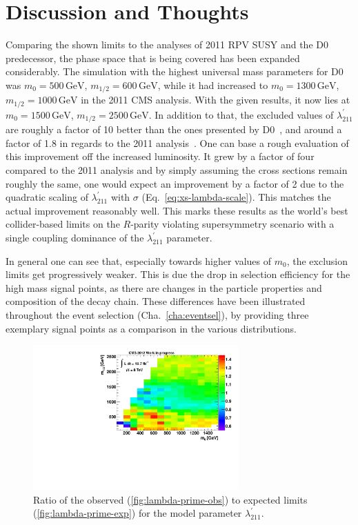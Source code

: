 \section{Discussion and Thoughts}
\label{sec:discussion}

Comparing the shown limits to the analyses of 2011 RPV SUSY and the D0 predecessor, the phase space that is being covered has been expanded considerably. The simulation with the highest universal mass parameters for D0 was $m_0 = 500\,\text{GeV}$, $m_{1/2} = 600\,\text{GeV}$, while it had increased to $m_0 = 1300\,\text{GeV}$, $m_{1/2} = 1000\,\text{GeV}$ in the 2011 CMS analysis. With the given results, it now lies at $m_0 = 1500\,\text{GeV}$, $m_{1/2} = 2500\,\text{GeV}$. In addition to that, the excluded values of $\lambda^{\prime}_{211}$ are roughly a factor of 10 better than the ones presented by D0~\cite{auter,d0rpv}, and around a factor of 1.8 in regards to the 2011 analysis~\cite{2011rpv}. One can base a rough evaluation of this improvement off the increased luminosity. It grew by a factor of four compared to the 2011 analysis and by simply assuming the cross sections remain roughly the same, one would expect an improvement by a factor of 2 due to the quadratic scaling of $\lambda^\prime_{211}$ with $\sigma$ (Eq.~\ref{eq:xs-lambda-scale}). This matches the actual improvement reasonably well. This marks these results as the world's best collider-based limits on the $R$-parity violating supersymmetry scenario with a single coupling dominance of the $\lambda^{\prime}_{211}$ parameter.

In general one can see that, especially towards higher values of $m_0$, the exclusion limits get progressively weaker. This is due the drop in selection efficiency for the high mass signal points, as there are changes in the particle properties and composition of the decay chain. These differences have been illustrated throughout the event selection (Cha.~\ref{cha:eventsel}), by providing three exemplary signal points as a comparison in the various distributions.


\begin{figure}[!htb]
  \centering
  \includegraphics[width=0.7\textwidth]{plots/lambda_ratio.pdf}
  \caption{Ratio of the observed (\ref{fig:lambda-prime-obs}) to expected limits (\ref{fig:lambda-prime-exp}) for the model parameter $\lambda^{\prime}_{211}$.}
  \label{fig:lambda_ratio}
\end{figure}

